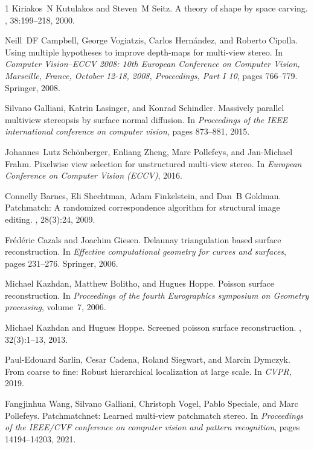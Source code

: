 \begin{thebibliography}{1}
Kiriakos~N Kutulakos and Steven~M Seitz.
\newblock A theory of shape by space carving.
, 38:199--218, 2000.

Neill~DF Campbell, George Vogiatzis, Carlos Hern{\'a}ndez, and Roberto Cipolla.
\newblock Using multiple hypotheses to improve depth-maps for multi-view stereo.
\newblock In {\em Computer Vision--ECCV 2008: 10th European Conference on Computer Vision, Marseille, France, October 12-18, 2008, Proceedings, Part I 10}, pages 766--779. Springer, 2008.

Silvano Galliani, Katrin Lasinger, and Konrad Schindler.
\newblock Massively parallel multiview stereopsis by surface normal diffusion.
\newblock In {\em Proceedings of the IEEE international conference on computer vision}, pages 873--881, 2015.

Johannes~Lutz Sch\"{o}nberger, Enliang Zheng, Marc Pollefeys, and Jan-Michael Frahm.
\newblock Pixelwise view selection for unstructured multi-view stereo.
\newblock In {\em European Conference on Computer Vision (ECCV)}, 2016.

Connelly Barnes, Eli Shechtman, Adam Finkelstein, and Dan~B Goldman.
\newblock Patchmatch: A randomized correspondence algorithm for structural image editing.
, 28(3):24, 2009.

Fr{\'e}d{\'e}ric Cazals and Joachim Giesen.
\newblock Delaunay triangulation based surface reconstruction.
\newblock In {\em Effective computational geometry for curves and surfaces}, pages 231--276. Springer, 2006.

Michael Kazhdan, Matthew Bolitho, and Hugues Hoppe.
\newblock Poisson surface reconstruction.
\newblock In {\em Proceedings of the fourth Eurographics symposium on Geometry processing}, volume~7, 2006.

Michael Kazhdan and Hugues Hoppe.
\newblock Screened poisson surface reconstruction.
, 32(3):1--13, 2013.

Paul-Edouard Sarlin, Cesar Cadena, Roland Siegwart, and Marcin Dymczyk.
\newblock From coarse to fine: Robust hierarchical localization at large scale.
\newblock In {\em CVPR}, 2019.

Fangjinhua Wang, Silvano Galliani, Christoph Vogel, Pablo Speciale, and Marc Pollefeys.
\newblock Patchmatchnet: Learned multi-view patchmatch stereo.
\newblock In {\em Proceedings of the IEEE/CVF conference on computer vision and pattern recognition}, pages 14194--14203, 2021.


\end{thebibliography}
